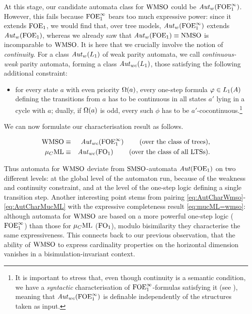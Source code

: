 At this stage, our candidate automata class for $\mathrm{WMSO}$ could be $\mathit{Aut}_{w}(\mathrm{FOE}^{\infty}_1)$. However, this fails because $\mathrm{FOE}^{\infty}_1$ bears too much expressive power: since it extends $\mathrm{FOE}_1$,
we would find that, over tree models, $\mathit{Aut}_{w}(\mathrm{FOE}^{\infty}_1)$ extends
$\mathit{Aut}_{w}(\mathrm{FOE}_1)$, whereas we already saw that $\mathit{Aut}_{w}(\mathrm{FOE}_1) \equiv
\mathrm{NMSO}$ is incomparable to $\mathrm{WMSO}$.
%
It is here that we crucially involve the notion of \emph{continuity}. 
For a class $\mathit{Aut}_{w}(L_{1})$ of weak parity automata, we call 
\emph{continuous-weak} parity automata, forming a class $\mathit{Aut}_{wc}(L_{1})$, those
satisfying the following additional constraint:
\begin{itemize}
\item 
for every state $a$ with even priority $\Omega(a)$, every one-step formula $\varphi
\in L_{1}(A)$ defining the transitions from $a$ has to be continuous in all
states $a'$ lying in a cycle with $a$;
dually, if $\Omega(a)$ is odd, every such $\phi$ has to be
$a'$-cocontinuous.\footnote{%
   It is important to stress that, even though continuity is a semantic 
   condition, we have a \emph{syntactic} characterisation of $\mathrm{FOE}^{\infty}_1$-formulas
   satisfying it (see \cite{carr:mode18}), meaning that 
   $\mathit{Aut}_{wc}(\mathrm{FOE}^{\infty}_1)$ is definable independently of the structures taken as
   input.
   }
\end{itemize}
We can now formulate our characterisation result as follows.
\begin{theorem}
\begin{eqnarray}
\wmso & \equiv & \AutWC(\ofoei)
 \qquad  \text{ (over the class of trees)}, \label{eq:AutCharWmso}
\\ \mucML & \equiv & \AutWC(\ofo)\label{eq:AutCharMucML}
  \qquad \text{ (over the class of all LTSs)}.
\end{eqnarray}
\end{theorem}
Thus automata for $\mathrm{WMSO}$ deviate from $\mathrm{SMSO}$-automata $\mathit{Aut}(\mathrm{FOE}_1)$ on two
different levels: at the global level of the automaton run, because of the 
weakness and continuity constraint, and at the level of the one-step logic 
defining a single transition step. 
Another interesting point stems from pairing
\eqref{eq:AutCharWmso}-\eqref{eq:AutCharMucML} with the expressive completeness
result \eqref{eq:mucML=wmso}: although automata for $\mathrm{WMSO}$ are based on a more
powerful one-step logic ($\mathrm{FOE}^{\infty}_1$) than those for $\mu_{C}\mathrm{ML}$ ($\mathrm{FO}_1$), modulo 
bisimilarity they characterise the same expressiveness.
This connects back to our previous observation, that the ability of $\mathrm{WMSO}$ to 
express cardinality properties on the horizontal dimension vanishes in a 
bisimulation-invariant context. 


